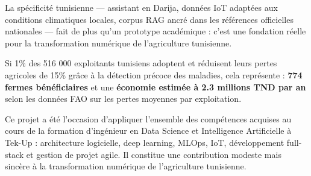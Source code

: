 La spécificité tunisienne — assistant en Darija, données IoT adaptées aux conditions
climatiques locales, corpus RAG ancré dans les références officielles nationales — fait
de \farmAI{} plus qu'un prototype académique : c'est une fondation réelle pour la
transformation numérique de l'agriculture tunisienne.

\medskip
\begin{tcolorbox}[technote, title={Impact attendu}]
Si 1\% des 516 000 exploitants tunisiens adoptent \farmAI{} et réduisent leurs pertes
agricoles de 15\% grâce à la détection précoce des maladies, cela représente :
\textbf{774 fermes bénéficiaires} et une \textbf{économie estimée à 2.3 millions TND
par an} selon les données FAO sur les pertes moyennes par exploitation.
\end{tcolorbox}

Ce projet a été l'occasion d'appliquer l'ensemble des compétences acquises au cours
de la formation d'ingénieur en Data Science et Intelligence Artificielle à Tek-Up :
architecture logicielle, deep learning, MLOps, IoT, développement full-stack et
gestion de projet agile. Il constitue une contribution modeste mais sincère à la
transformation numérique de l'agriculture tunisienne.
